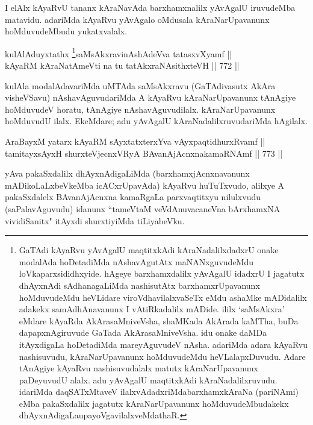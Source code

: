 \begin{artha} 
I elAlx kAyaRvU tananx kAraNavAda barxhamxnalilx yAvAgalU iruvudeMba 
matavidu. adariMda kAyaRvu yAvAgalo oMdusala kAraNarUpavanunx 
hoMduvudeMbudu yukatxvalalx.
\end{artha}


\begin{shl}
kulAlAduyxtathx \footnote{GaTAdi kAyaRvu yAvAgalU maqtitxkAdi kAraNadalilxdadxrU onake modalAda hoDetadiMda nAshavAgutAtx maNANxguvudeMdu loVkaparxsididhxyide. hAgeye barxhamxdalilx yAvAgalU idadxrU I jagatutx dhAyxnAdi sAdhanagaLiMda nashisutAtx barxhamxrUpavanunx hoMduvudeMdu heVLidare viroVdhavilalxvaSeTx eMdu \ndash  ashaMke mADidalilx adakekx samAdhAnavanunx I vAtiRkadalilx mADide. ililx `saMsAkxra' eMdare kAyaRda AkArasaMniveVsha, shaMKada AkArada kaMTha, buDa dapapxnAgiruvude GaTada AkArasaMniveVsha. idu onake daMDa itAyxdigaLa hoDetadiMda mareyAguvudeV nAsha. adariMda adara kAyaRvu nashisuvudu, kAraNarUpavanunx hoMduvudeMdu heVLalapxDuvudu. Adare tAnAgiye kAyaRvu nashisuvudalalx matutx kAraNarUpavanunx paDeyuvudU alalx. adu yAvAgalU maqtitxkAdi kAraNadalilxruvudu. idariMda daqSATxMtaveV ilalxvAdadxriMda\break barxhamxkAraNa (pariNAmi) eMba pakaSxdalilx jagatutx kAraNarUpavanunx hoMduvudeMbudakekx dhAyxnAdigaLa\break upayoVgavilalxveMdathaR.}saMsAkxravinAshAdeVva tatasxvXyamf || \\
kAyaRM kAraNatAmeVti na tu tatAkxraNAsithxteVH \hfill || 772 ||  
\end{shl}

\begin{artha} 
kulAla modalAdavariMda uMTAda saMsAkxravu (GaTAdivasutx AkAra 
visheVSavu) nAshavAguvudariMda A kAyaRvu kAraNarUpavanunx tAnAgiye 
hoMduvudeV horatu, tAnAgiye nAshavAguvudilalx. kAraNarUpavanunx 
hoMduvudU ilalx. EkeMdare; adu yAvAgalU kAraNadalilxruvudariMda 
hAgilalx.
\end{artha}


\begin{shl}
AraBayxM yatarx kAyaRM sAyxtatxterxYva vAyxpaqtidhurxRvamf || \\
tamitayxsAyxH shurxteVjecnxVRyA BAvanAjAcnxnakamaRNAmf \hfill || 773 ||  
\end{shl}

\begin{artha} 
yAva pakaSxdalilx dhAyxnAdigaLiMda (barxhamxjAcnxnavanunx mADikoLaLxbeVkeMba icACxrUpavAda) kAyaRvu huTuTxvudo, alilxye A pakaSxdalelx BAvanAjAcnxna kamaRgaLa parxvaqtitxyu nilulxvudu (saPalavAguvudu) idanunx ``tameVtaM veVdAnuvacaneVna bArxhamxNA vividiSanitx" itAyxdi shurxtiyiMda tiLiyabeVku.
\end{artha}


